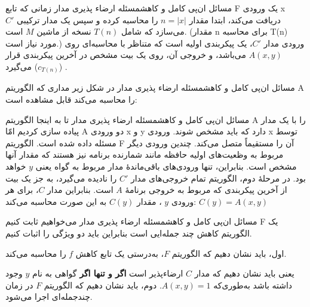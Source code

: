 \begin{itemframe-s}{مسائل ان‌پی کامل و کاهش}{مسئله ارضاء پذیری مدار}
\itm
زمانی که تابع F یک ورودی x دریافت می‌کند، ابتدا مقدار
 $n = |x|$
را محاسبه کرده و سپس یک مدار ترکیبی $C'$ می‌سازد که شامل $T(n)$ نسخه از ماشین $M$ است. (مقدار n برای محاسبه T(n) مورد نیاز است.)
\itm
ورودی مدار $C'$، یک پیکربندی اولیه است که متناظر با محاسبه‌ای روی $A(x, y)$ می‌باشد، و خروجی آن، روی یک بیت مشخص در آخرین پیکربندی قرار می‌گیرد ($c_{T(n)}$) .

\end{itemframe-s}

\begin{itemframe-s}{مسائل ان‌پی کامل و کاهش}{مسئله ارضاء پذیری مدار}
\itm
در شکل زیر مداری که الگوریتم A را محاسبه می‌کند قابل مشاهده است:

\end{itemframe-s}

\begin{itemframe-s}{مسائل ان‌پی کامل و کاهش}{مسئله ارضاء پذیری مدار}
\itm
تا به اینجا الگوریتم A را با یک مدار پیاده سازی کردیم امّا A دو ورودی x و y دارد که باید مشخص شوند. ورودی x توسط مسئله داده شده است. الگوریتم F آن را مستقیماً متصل می‌کند. چندین ورودی دیگر مربوط به وظعیت‌های اولیه حافظه مانند شمارنده برنامه نیز هستند که مقدار آنها مشخص است.
\itm
بنابراین، تنها ورودی‌های باقی‌ماندهٔ مدار مربوط به گواه یعنی $y$ خواهد بود.
\itm
در مرحلهٔ دوم، الگوریتم تمام خروجی‌های مدار $C'$ را نادیده می‌گیرد، به جز یک بیت از آخرین پیکربندی که مربوط به خروجی برنامهٔ $A$ است.
\itm
بنابراین مدار $C$، برای هر ورودی $y$ ، مقدار $C(y)$ به این صورت محاسبه می‌کند:
$C(y) = A(x, y)$
\end{itemframe-s}

\begin{itemframe-s}{مسائل ان‌پی کامل و کاهش}{مسئله ارضاء پذیری مدار}
\itm
می‌خواهیم ثابت کنیم F یک الگوریتم کاهش چند جمله‌ایی است بنابراین باید دو ویژگی را اثبات کنیم.

\itm
اول، باید نشان دهیم که الگوریتم $F$، به‌درستی یک تابع کاهش $f$ را محاسبه می‌کند.

یعنی باید نشان دهیم که مدار $C$ ارضاء‌پذیر است \textbf{اگر و تنها اگر} گواهی به نام $y$ وجود داشته باشد به‌طوری‌که
$A(x, y) = 1$.
\itm
دوم، باید نشان دهیم که الگوریتم $F$ در زمان چندجمله‌ای اجرا می‌شود.
\end{itemframe-s}

